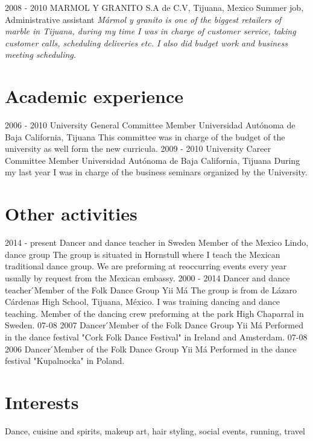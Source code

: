 \documentclass[]{friggeri-cv}
\begin{document}
\begin{entrylist}
  \entry
    {2008 - 2010}
    {MARMOL Y GRANITO S.A de C.V, Tijuana, Mexico}
    {Summer job, Administrative assistant}
    {\emph{Mármol y granito is one of the biggest retailers of
    marble in Tijuana, during my time I was in charge of 
    customer service, taking customer calls, scheduling 
    deliveries etc. I also did budget work and business 
    meeting scheduling.}}
\end{entrylist}

\section{Academic experience}
\begin{entrylist}
  \entry
    {2006 - 2010}
    {University General Committee Member}
    {Universidad Autónoma de Baja California, Tijuana}
    {This committee was in charge of the budget of the 
    university as well form the new curricula.}
  \entry
    {2009 - 2010}
    {University Career Committee Member}
    {Universidad Autónoma de Baja California, Tijuana}
    {During my last year I was in charge of the business seminars
    organized by the University.}
\end{entrylist}

\section{Other activities}

\begin{entrylist}
  \entry
    {2014 - present}
    {Dancer and dance teacher in Sweden}
    {Member of the Mexico Lindo, dance group}
    {The group is situated in Hornstull where I teach the Mexican traditional dance group. We are preforming at
    reoccurring events every year usually by request from the Mexican embassy.}
  \entry
    {2000 - 2014}
    {Dancer and dance teacher}
    {́Member of the Folk Dance Group Yii Má}
    {The group is from de Lázaro Cárdenas High School, Tijuana, 
    México. I was training dancing and dance teaching. Member of the
    dancing crew preforming at the park High Chaparral in Sweden.}
  \entry
    {07-08 2007}
    {Dancer}
    {́Member of the Folk Dance Group Yii Má}
    {Performed in the dance festival "Cork Folk
    Dance Festival" in Ireland and Amsterdam.}
  \entry
    {07-08 2006}
    {Dancer}
    {́Member of the Folk Dance Group Yii Má}
    {Performed in the dance festival "Kupalnocka" in Poland.}
\end{entrylist}

\section{Interests}
    Dance, cuisine and spirits, makeup art, hair styling, social events, running, travel
\end{document}
